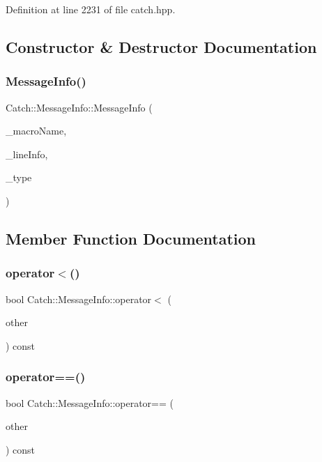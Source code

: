Definition at line 2231 of file catch.\+hpp.



\subsection{Constructor \& Destructor Documentation}
\mbox{\label{struct_catch_1_1_message_info_afac7a84a9e8655428035a3c5418044f0}} 
\subsubsection{MessageInfo()}
{\footnotesize\ttfamily Catch\+::\+Message\+Info\+::\+Message\+Info (\begin{DoxyParamCaption}\item[{\textbf{ String\+Ref} const \&}]{\+\_\+macro\+Name,  }\item[{\textbf{ Source\+Line\+Info} const \&}]{\+\_\+line\+Info,  }\item[{\textbf{ Result\+Was\+::\+Of\+Type}}]{\+\_\+type }\end{DoxyParamCaption})}



\subsection{Member Function Documentation}
\mbox{\label{struct_catch_1_1_message_info_a8254cb8fca2da02a29a9843cdcb79df1}} 
\subsubsection{operator$<$()}
{\footnotesize\ttfamily bool Catch\+::\+Message\+Info\+::operator$<$ (\begin{DoxyParamCaption}\item[{\textbf{ Message\+Info} const \&}]{other }\end{DoxyParamCaption}) const}

\mbox{\label{struct_catch_1_1_message_info_af4b37f2172ba55395813b4bb6bbbde1a}} 
\subsubsection{operator==()}
{\footnotesize\ttfamily bool Catch\+::\+Message\+Info\+::operator== (\begin{DoxyParamCaption}\item[{\textbf{ Message\+Info} const \&}]{other }\end{DoxyParamCaption}) const}



